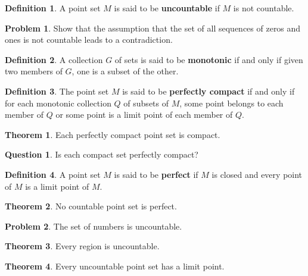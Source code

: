 \documentclass{article}
\theoremstyle{definition}
\newtheorem{definition}{Definition}
\newtheorem{question}{Question}
\newtheorem{theorem}{Theorem}
\theoremstyle{definition}
\newtheorem{problem}{Problem}
\theoremstyle{plain}
\begin{document}
\begin{definition}
  A point set $M$ is said to be \textbf{uncountable} if $M$ is not countable.
\end{definition}

\begin{problem}
  Show that the assumption that the set of all sequences of zeros and ones is
  not countable leads to a contradiction.
\end{problem}

\begin{definition}
  A collection $G$ of sets is said to be \textbf{monotonic} if and only if
  given two members of $G$, one is a subset of the other.
\end{definition}

\begin{definition}
  The point set $M$ is said to be \textbf{perfectly compact} if and only if for
  each monotonic collection $Q$ of subsets of $M$, some point belongs to each
  member of $Q$ or some point is a limit point of each member of $Q$.
\end{definition}

\begin{theorem}
  Each perfectly compact point set is compact.
\end{theorem}

\begin{question}
  Is each compact set perfectly compact?
\end{question}

\begin{definition}
  A point set $M$ is said to be \textbf{perfect} if $M$ is closed and every
  point of $M$ is a limit point of $M$.
\end{definition}

\begin{theorem}
  No countable point set is perfect.
\end{theorem}

\begin{problem}
  The set of numbers is uncountable.
\end{problem}

\begin{theorem}
  Every region is uncountable.
\end{theorem}

\begin{theorem}
  Every uncountable point set has a limit point.
\end{theorem}
\end{document}
